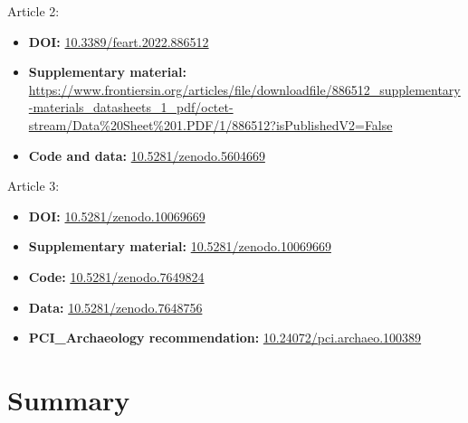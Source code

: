 \documentclass[
  b5paper,
]{book}
\providecommand{\tightlist}{%
  \setlength{\itemsep}{0pt}\setlength{\parskip}{0pt}}
\begin{document}
Article 2:

\begin{itemize}
\tightlist
\item
  \textbf{DOI:}
  \href{https://doi.org/10.3389/feart.2022.886512}{10.3389/feart.2022.886512}
\item
  \textbf{Supplementary material:}
  \url{https://www.frontiersin.org/articles/file/downloadfile/886512_supplementary-materials_datasheets_1_pdf/octet-stream/Data\%20Sheet\%201.PDF/1/886512?isPublishedV2=False}
\item
  \textbf{Code and data:}
  \href{https://doi.org/10.5281/zenodo.5604669}{10.5281/zenodo.5604669}
\end{itemize}

Article 3:

\begin{itemize}
\tightlist
\item
  \textbf{DOI:}
  \href{https://doi.org/10.5281/zenodo.10069669}{10.5281/zenodo.10069669}
\item
  \textbf{Supplementary material:}
  \href{https://doi.org/10.5281/zenodo.10069669}{10.5281/zenodo.10069669}
\item
  \textbf{Code:}
  \href{https://doi.org/10.5281/zenodo.7649824}{10.5281/zenodo.7649824}
\item
  \textbf{Data:}
  \href{https://doi.org/10.5281/zenodo.7648756}{10.5281/zenodo.7648756}
\item
  \textbf{PCI\_Archaeology recommendation:}
  \href{https://doi.org/10.24072/pci.archaeo.100389}{10.24072/pci.archaeo.100389}
\end{itemize}

\hypertarget{summary-6}{%
\chapter*{Summary}\label{summary-6}}

\end{document}
